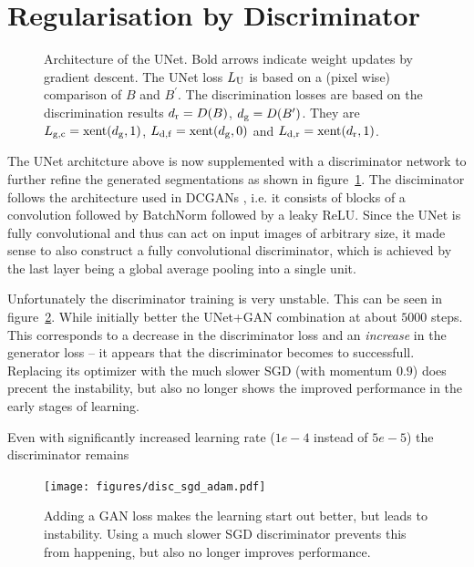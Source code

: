 \documentclass[aps,prl,twocolumn,groupedaddress,amsmath,amssymb]{revtex4-1}
\begin{document}
    \section{Regularisation by Discriminator}

    \begin{figure}[tbp]
        \begin{center}
        
        \end{center}
        \caption{Architecture of the UNet. Bold arrows indicate weight updates by gradient descent. 
        The UNet loss $L_{\mathrm{U}}$ is based on a (pixel wise) comparison of $B$ and $B^{\prime}$. The
        discrimination losses are based on the discrimination results $d_{\mathrm{r}} = D(B)$, 
        $d_{\mathrm{g}}=D(B^{\prime})$. They are $L_{\mathrm{g, c}} = \mathrm{xent}(d_{\mathrm{g}}, 1)$, 
        $L_{\mathrm{d, f}} = \mathrm{xent}(d_{\mathrm{g}}, 0)$ and $L_{\mathrm{d, r}} = \mathrm{xent}(d_{\mathrm{r}}, 1)$.}
        \label{fig:unet_dics}
    \end{figure}
    
    The UNet architcture above is now supplemented with a discriminator network to further refine
    the generated segmentations as shown in figure~\ref{fig:unet_dics}. The disciminator follows the
    architecture used in DCGANs \cite{dcgan}, i.e. it consists of blocks of a convolution followed
    by BatchNorm followed by a leaky ReLU. Since the UNet is fully convolutional and thus can act on
    input images of arbitrary size, it made sense to also construct a fully convolutional
    discriminator, which is achieved by the last layer being a global average pooling into a single
    unit.

    Unfortunately the discriminator training is very unstable. This can be seen in
    figure~\ref{fig:gan_adam}. While initially better the UNet+GAN combination at about $5000$
    steps. This corresponds to a decrease in the discriminator loss and an \emph{increase} in the
    generator loss -- it appears that the discriminator becomes to successfull. Replacing its 
    optimizer with the much slower SGD (with momentum $0.9$) does precent the instability, but also
    no longer shows the improved performance in the early stages of learning. 

    Even with 
    significantly increased learning rate ($1e-4$ instead of $5e-5$) the discriminator remains  

    \begin{figure}[tbp]
        \begin{center}
        \texttt{[image: figures/disc\_sgd\_adam.pdf]}
        \end{center}
        \caption{Adding a GAN loss makes the learning start out better, but leads to instability. 
        Using a much slower SGD discriminator prevents this from happening, but also no longer 
        improves performance.}
        \label{fig:gan_adam}
    \end{figure}
\end{document}
